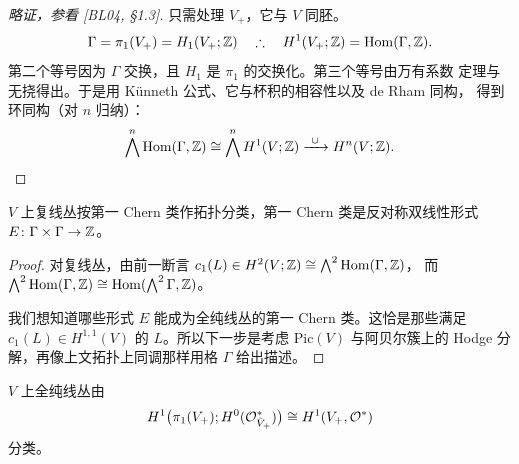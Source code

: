 \begin{proof}[{略证，参看 [BL04, §1.3]}]
只需处理 $V_+$，它与 $V$ 同胚。
\[
\Gamma=\pi_1(V_+)=H_1(V_+;\mathbb{Z})\quad\therefore\quad H^1(V_+;\mathbb{Z})=\operatorname{Hom}(\Gamma,\mathbb{Z}).
\]
第二个等号因为 $\Gamma$ 交换，且 $H_1$ 是 $\pi_1$ 的交换化。第三个等号由万有系数
定理与无挠得出。于是用 K\"unneth 公式、它与杯积的相容性以及 de Rham 同构，
得到环同构（对 $n$ 归纳）：
\[
\bigwedge^n\operatorname{Hom}(\Gamma,\mathbb{Z})\cong\bigwedge^n H^1(V;\mathbb{Z})
\xrightarrow{\ \cup\ }H^n(V;\mathbb{Z}).\qedhere
\]
\end{proof}

\begin{corollary}[{[Pol03, §1]}]\label{cor:line-bundles-top}
$V$ 上复线丛按第一 Chern 类作拓扑分类，第一 Chern 类是反对称双线性形式
$E\colon\Gamma\times\Gamma\to\mathbb{Z}$。
\end{corollary}

\begin{proof}
对复线丛，由前一断言 $c_1(L)\in H^2(V;\mathbb{Z})\cong\bigwedge^2\operatorname{Hom}(\Gamma,\mathbb{Z})$，
而 $\bigwedge^2\operatorname{Hom}(\Gamma,\mathbb{Z})\cong\operatorname{Hom}(\bigwedge^2\Gamma,\mathbb{Z})$。

我们想知道哪些形式 $E$ 能成为全纯线丛的第一 Chern 类。这恰是那些满足
$c_1(L)\in H^{1,1}(V)$ 的 $L$。所以下一步是考虑 $\mathrm{Pic}(V)$ 与阿贝尔簇上的
Hodge 分解，再像上文拓扑上同调那样用格 $\Gamma$ 给出描述。
\end{proof}

\begin{claim}\label{claim:holomorphic-line-bundles}
$V$ 上全纯线丛由
\begin{equation}\label{eq:1-4}
H^1\bigl(\pi_1(V_+);H^0(\mathcal{O}^*_{\tilde V_+})\bigr)\cong H^1(V_+,\mathcal{O}^*)
\end{equation}
分类。
\end{claim}

